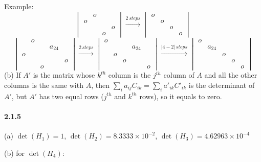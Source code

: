\documentclass[a4paper]{article}
\begin{document}
Example:
\[
\begin{vmatrix}
 &o& & \\
 o& & & \\
 & & &o\\
 & &o&
\end{vmatrix}
\xrightarrow{2\,steps}
\begin{vmatrix}
 o&& & \\
 &o& & \\
 & &o&\\
 & &&o
\end{vmatrix}
\]
\[
\begin{vmatrix}
 &o&&&\\
 &&&a_{24}&\\
 o&&&&\\
 &&&&o\\
 &&o&&
\end{vmatrix}
\xrightarrow{2\,steps}
\begin{vmatrix}
 o&&&&\\
 &&&a_{24}&\\
 &o&&&\\
 &&o&&\\
 &&&&o
\end{vmatrix}
\xrightarrow{|4-2|\,steps}
\begin{vmatrix}
 o&&&&\\
 &a_{24}&&&\\
 &&o&&\\
 &&&o&\\
 &&&&o
\end{vmatrix}
\]
(b) If $A'$ is the matrix whose $k^{th}$ column is the $j^{th}$ column of $A$ and all the other columns is the same with $A$,  then $\sum_ia_{ij}C_{ik}=\sum_{i}a'_{ik}C'_{ik}$ is the determinant of $A'$, but $A'$ has two equal rows ($j^{th}$ and $k^{th}$ rows), so it equals to zero.

\paragraph{2.1.5}
(a) $\det(H_1)=1$, $\det(H_2)=8.3333\times10^{-2}$, $\det(H_3)=4.62963\times10^{-4}$

(b)
for $\det(H_4)$: 
\end{document}
